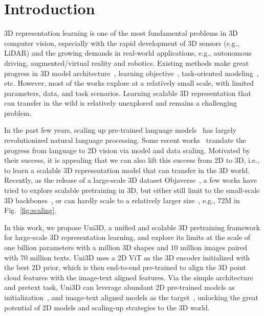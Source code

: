 \documentclass{article} \usepackage{iclr2024_conference,times}
\def\Ours{Uni3D\xspace}
\begin{document}
\section{Introduction}

3D representation learning is one of the most fundamental problems in 3D computer vision, especially with the rapid development of 3D sensors (e.g., LiDAR) and the growing demands in real-world applications, e.g., autonomous driving, augmented/virtual reality and robotics.  
Existing methods make great progress in 3D model architecture~\citep{qi2017pointnet, qi2017pointnet++, yu2021pointr, wang2019dynamic}, learning objective~\citep{yu2022point, wang2021unsupervised}, task-oriented modeling~\citep{zhou2020cylinder3d, yin2021center, zhao2021point}, etc.
However, most of the works explore at a relatively small scale, with limited parameters, data, and task scenarios. 
Learning scalable 3D representation that can transfer in the wild is relatively unexplored and remains a challenging problem.

In the past few years, scaling up pre-trained language models~\citep{brown2020language, liu2019roberta, raffel2020exploring} has largely revolutionized natural language processing.
Some recent works~\citep{radford2021learning, dosovitskiy2020image, bao2021beit, he2022masked, fang2023eva} translate the progress from language to 2D vision via model and data scaling. 
Motivated by their success, it is appealing that we can also lift this success from 2D to 3D, i.e., to learn a scalable 3D representation model that can transfer in the 3D world.
Recently, as the release of a large-scale 3D dataset Objaverse~\citep{deitke2023objaverse}, a few works have tried to explore scalable pretraining in 3D, but either still limit to the small-scale 3D backbones~\citep{xue2023ulip, xue2023ulip2}, or can hardly scale to a relatively larger size~\citep{liu2023openshape}, e.g., 72M in Fig.~\ref{fig:scaling}.

In this work, we propose \Ours, a unified and scalable 3D pretraining framework for large-scale 3D representation learning, and explore its limits at the scale of one billion parameters with a million 3D shapes and 10 million images paired with 70 million texts. 
\Ours uses a 2D ViT as the 3D encoder initialized with the best 2D prior, which is then end-to-end pre-trained to align the 3D point cloud features with the image-text aligned features.
Via the simple architecture and pretext task, \Ours can leverage abundant 2D pre-trained models as initialization~\citep{fang2023eva,  caron2021emerging},  and image-text aligned models as the target~\citep{radford2021learning, sun2023eva, cherti2023reproducible}, unlocking the great potential of 2D models and scaling-up strategies to the 3D world.
\end{document}
